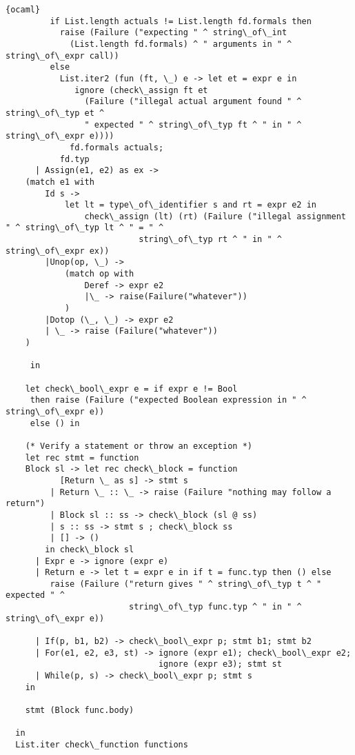 \begin{lstlisting}{ocaml}
         if List.length actuals != List.length fd.formals then
           raise (Failure ("expecting " ^ string\_of\_int
             (List.length fd.formals) ^ " arguments in " ^ string\_of\_expr call))
         else
           List.iter2 (fun (ft, \_) e -> let et = expr e in
              ignore (check\_assign ft et
                (Failure ("illegal actual argument found " ^ string\_of\_typ et ^
                " expected " ^ string\_of\_typ ft ^ " in " ^ string\_of\_expr e))))
             fd.formals actuals;
           fd.typ
      | Assign(e1, e2) as ex ->
	(match e1 with
		Id s -> 
 			let lt = type\_of\_identifier s and rt = expr e2 in
     			check\_assign (lt) (rt) (Failure ("illegal assignment " ^ string\_of\_typ lt ^ " = " ^
                           string\_of\_typ rt ^ " in " ^ string\_of\_expr ex))
		|Unop(op, \_) ->
			(match op with 
				Deref -> expr e2
				|\_ -> raise(Failure("whatever"))
			)
		|Dotop (\_, \_) -> expr e2
		| \_ -> raise (Failure("whatever"))
	)

     in

    let check\_bool\_expr e = if expr e != Bool
     then raise (Failure ("expected Boolean expression in " ^ string\_of\_expr e))
     else () in

    (* Verify a statement or throw an exception *)
    let rec stmt = function
	Block sl -> let rec check\_block = function
           [Return \_ as s] -> stmt s
         | Return \_ :: \_ -> raise (Failure "nothing may follow a return")
         | Block sl :: ss -> check\_block (sl @ ss)
         | s :: ss -> stmt s ; check\_block ss
         | [] -> ()
        in check\_block sl
      | Expr e -> ignore (expr e)
      | Return e -> let t = expr e in if t = func.typ then () else
         raise (Failure ("return gives " ^ string\_of\_typ t ^ " expected " ^
                         string\_of\_typ func.typ ^ " in " ^ string\_of\_expr e))
           
      | If(p, b1, b2) -> check\_bool\_expr p; stmt b1; stmt b2
      | For(e1, e2, e3, st) -> ignore (expr e1); check\_bool\_expr e2;
                               ignore (expr e3); stmt st
      | While(p, s) -> check\_bool\_expr p; stmt s
    in

    stmt (Block func.body)
   
  in
  List.iter check\_function functions
\end{lstlisting}
